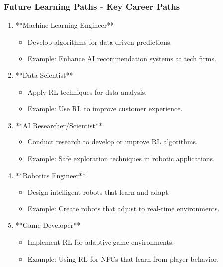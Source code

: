 \documentclass[aspectratio=169]{beamer}
\begin{document}
\begin{frame}[fragile]
    \frametitle{Future Learning Paths - Key Career Paths}
    \begin{enumerate}
        \item **Machine Learning Engineer**
            \begin{itemize}
                \item Develop algorithms for data-driven predictions.
                \item Example: Enhance AI recommendation systems at tech firms.
            \end{itemize}
        \item **Data Scientist**
            \begin{itemize}
                \item Apply RL techniques for data analysis.
                \item Example: Use RL to improve customer experience.
            \end{itemize}
        \item **AI Researcher/Scientist**
            \begin{itemize}
                \item Conduct research to develop or improve RL algorithms.
                \item Example: Safe exploration techniques in robotic applications.
            \end{itemize}
        \item **Robotics Engineer**
            \begin{itemize}
                \item Design intelligent robots that learn and adapt.
                \item Example: Create robots that adjust to real-time environments.
            \end{itemize}
        \item **Game Developer**
            \begin{itemize}
                \item Implement RL for adaptive game environments.
                \item Example: Using RL for NPCs that learn from player behavior.
            \end{itemize}
    \end{enumerate}
\end{frame}
\end{document}
